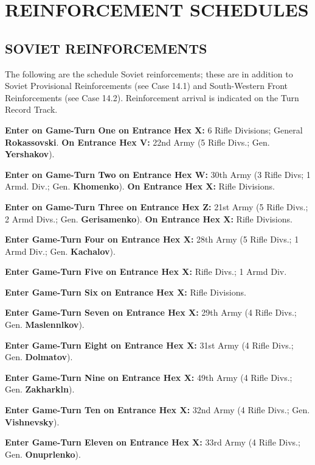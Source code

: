 \section{REINFORCEMENT SCHEDULES}

\subsection{SOVIET REINFORCEMENTS}

The following are the schedule Soviet reinforcements; these are in addition to Soviet Provisional Reinforcements (see Case 14.1) and South-Western Front Reinforcements (see Case 14.2). Reinforcement arrival is indicated on the Turn Record Track.

\begin{flushleft}
  \textbf{Enter on Game-Turn One on Entrance Hex X:}
  6 Rifle Divisions; General \textbf{Rokassovski}.
  \break
  \textbf{On Entrance Hex V:}
  \break
  22nd Army (5 Rifle Divs.; Gen. \textbf{Yershakov}).

  \textbf{Enter on Game-Turn Two on Entrance Hex W:}
  30th Army (3 Rifle Divs; 1 Armd. Div.; Gen. \textbf{Khomenko}).
  \break
  \textbf{On Entrance Hex X:}
   Rifle Divisions.

  \textbf{Enter on Game-Turn Three on Entrance Hex Z:}
  21st Army (5 Rifle Divs.; 2 Armd Divs.; Gen. \textbf{Gerisamenko}).
  \break
  \textbf{On Entrance Hex X:}
   Rifle Divisions.

  \textbf{Enter Game-Turn Four on Entrance Hex X:}
  28th Army (5 Rifle Divs.; 1 Armd Div.; Gen. \textbf{Kachalov}).

  \textbf{Enter Game-Turn Five on Entrance Hex X:}
   Rifle Divs.; 1 Armd Div.

  \textbf{Enter Game-Turn Six on Entrance Hex X:}
   Rifle Divisions.

  \textbf{Enter Game-Turn Seven on Entrance Hex X:}
  \break
  29th Army (4 Rifle Divs.; Gen. \textbf{Maslennlkov}).

  \textbf{Enter Game-Turn Eight on Entrance Hex X:}
  \break
  31st Army (4 Rifle Divs.; Gen. \textbf{Dolmatov}).

  \textbf{Enter Game-Turn Nine on Entrance Hex X:}
  \break
  49th Army (4 Rifle Divs.; Gen. \textbf{Zakharkln}).

  \textbf{Enter Game-Turn Ten on Entrance Hex X:}
  \break
  32nd Army (4 Rifle Divs.; Gen. \textbf{Vishnevsky}).

  \textbf{Enter Game-Turn Eleven on Entrance Hex X:}
  \break
  33rd Army (4 Rifle Divs.; Gen. \textbf{Onuprlenko}).
\end{flushleft}


